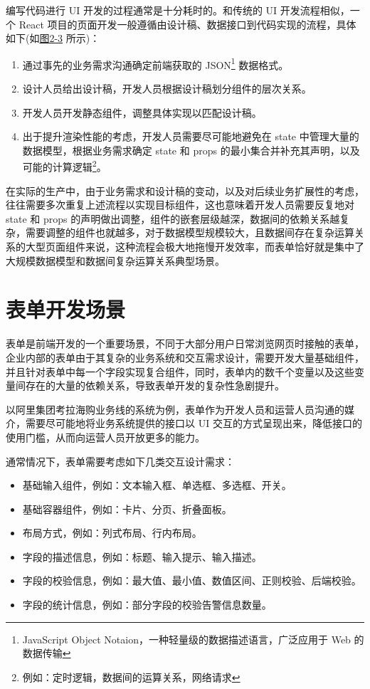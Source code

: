 \documentclass[winfonts,master,twoside]{njuthesis}
\begin{document}
编写代码进行 UI 开发的过程通常是十分耗时的\cite{schramm2010rapid}\cite{nguyen2015reverse}。和传统的 UI 开发流程相似，一个 React 项目的页面开发一般遵循由设计稿、数据接口到代码实现的流程\cite{myers1992survey}，具体如下(如\hyperref[react-component-development-pipeline]{图2-3} 所示)：

\begin{enumerate}
    \item 通过事先的业务需求沟通确定前端获取的 JSON\footnote{JavaScript Object Notaion，一种轻量级的数据描述语言，广泛应用于 Web 的数据传输\cite{json}} 数据格式\cite{nurseitov2009comparison}。
    \item 设计人员给出设计稿，开发人员根据设计稿划分组件的层次关系。
    \item 开发人员开发静态组件，调整具体实现以匹配设计稿。
    \item 出于提升渲染性能的考虑，开发人员需要尽可能地避免在 state 中管理大量的数据模型，根据业务需求确定 state 和 props 的最小集合并补充其声明，以及可能的计算逻辑\footnote{例如：定时逻辑，数据间的运算关系，网络请求}。
\end{enumerate}

在实际的生产中，由于业务需求和设计稿的变动，以及对后续业务扩展性的考虑，往往需要多次重复上述流程以实现目标组件，这也意味着开发人员需要反复地对 state 和 props 的声明做出调整，组件的嵌套层级越深，数据间的依赖关系越复杂，需要调整的组件也就越多，对于数据模型规模较大，且数据间存在复杂运算关系的大型页面组件来说，这种流程会极大地拖慢开发效率，而表单恰好就是集中了大规模数据模型和数据间复杂运算关系典型场景。

\section{表单开发场景}\label{form-development-scene}

表单是前端开发的一个重要场景，不同于大部分用户日常浏览网页时接触的表单，企业内部的表单由于其复杂的业务系统和交互需求设计，需要开发大量基础组件，并且针对表单中每一个字段实现复合组件，同时，表单内的数千个变量以及这些变量间存在的大量的依赖关系，导致表单开发的复杂性急剧提升。

以阿里集团考拉海购业务线的系统为例，表单作为开发人员和运营人员沟通的媒介，需要尽可能地将业务系统提供的接口以 UI 交互的方式呈现出来，降低接口的使用门槛，从而向运营人员开放更多的能力。

通常情况下，表单需要考虑如下几类交互设计需求\cite{bargas2007usable}\cite{bargas2011working}\cite{bargas2010simple}：

\begin{itemize}
    \item 基础输入组件，例如：文本输入框、单选框、多选框、开关。
    \item 基础容器组件，例如：卡片、分页、折叠面板。
    \item 布局方式，例如：列式布局、行内布局。
    \item 字段的描述信息，例如：标题、输入提示、输入描述。
    \item 字段的校验信息，例如：最大值、最小值、数值区间、正则校验、后端校验。
    \item 字段的统计信息，例如：部分字段的校验告警信息数量。
\end{itemize}
\end{document}
